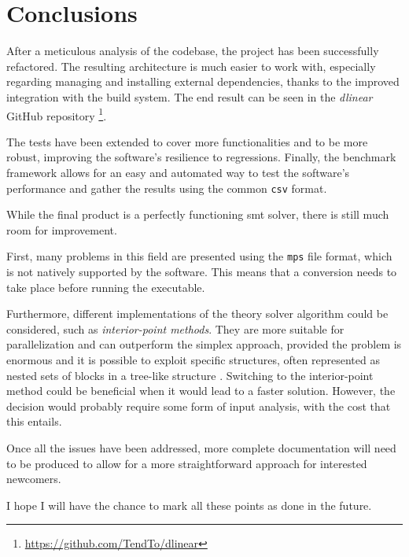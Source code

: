 \chapter{Conclusions}

After a meticulous analysis of the codebase, the project has been successfully refactored.
The resulting architecture is much easier to work with, especially regarding managing and installing external dependencies, thanks to the improved integration with the \bazel build system.
The end result can be seen in the \textit{dlinear} GitHub repository \footnote{\url{https://github.com/TendTo/dlinear}}.

The tests have been extended to cover more functionalities and to be more robust, improving the software's resilience to regressions.
Finally, the benchmark framework allows for an easy and automated way to test the software's performance and gather the results using the common \texttt{csv} format.

While the final product is a perfectly functioning \gls{smt} solver, there is still much room for improvement.

First, many problems in this field are presented using the \texttt{mps} file format, which is not natively supported by the software.
This means that a conversion needs to take place before running the executable.

Furthermore, different implementations of the theory solver algorithm could be considered, such as \textit{interior-point methods}.
They are more suitable for parallelization and can outperform the simplex approach, provided the problem is enormous and it is possible to exploit specific structures, often represented as nested sets of blocks in a tree-like structure \cite{paper:parallel-interior-point}.
Switching to the interior-point method could be beneficial when it would lead to a faster solution.
However, the decision would probably require some form of input analysis, with the cost that this entails.

Once all the issues have been addressed, more complete documentation will need to be produced to allow for a more straightforward approach for interested newcomers.

I hope I will have the chance to mark all these points as done in the future.
